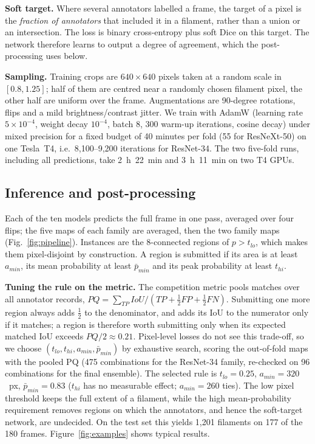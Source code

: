 \documentclass[sigconf]{acmart}
\begin{document}
    \textbf{Soft target.} Where several annotators labelled a frame, the target of a pixel is the \emph{fraction of annotators} that included it in a filament, rather than a union or an intersection. The loss is binary cross-entropy plus soft Dice on this target. The network therefore learns to output a degree of agreement, which the post-processing uses below.

    \textbf{Sampling.} Training crops are $640\times640$ pixels taken at a random scale in $[0.8, 1.25]$; half of them are centred near a randomly chosen filament pixel, the other half are uniform over the frame. Augmentations are 90-degree rotations, flips and a mild brightness/contrast jitter. We train with AdamW \cite{loshchilov2019adamw} (learning rate $5\times10^{-4}$, weight decay $10^{-4}$, batch 8, 300 warm-up iterations, cosine decay) under mixed precision for a fixed budget of 40 minutes per fold (55 for ResNeXt-50) on one Tesla~T4, i.e.\ 8{,}100--9{,}200 iterations for ResNet-34. The two five-fold runs, including all predictions, take 2~h~22~min and 3~h~11~min on two T4 GPUs.

\subsection{Inference and post-processing}
    Each of the ten models predicts the full frame in one pass, averaged over four flips; the five maps of each family are averaged, then the two family maps (Fig.~\ref{fig:pipeline}). Instances are the 8-connected regions of $p>t_{lo}$, which makes them pixel-disjoint by construction. A region is submitted if its area is at least $a_{min}$, its mean probability at least $\bar p_{min}$ and its peak probability at least $t_{hi}$.

    \textbf{Tuning the rule on the metric.} The competition metric pools matches over all annotator records, $PQ=\sum_{TP} IoU / (TP + \tfrac12 FP + \tfrac12 FN)$. Submitting one more region always adds $\tfrac12$ to the denominator, and adds its IoU to the numerator only if it matches; a region is therefore worth submitting only when its expected matched IoU exceeds $PQ/2\approx0.21$. Pixel-level losses do not see this trade-off, so we choose $(t_{lo}, t_{hi}, a_{min}, \bar p_{min})$ by exhaustive search, scoring the out-of-fold maps with the pooled PQ (475 combinations for the ResNet-34 family, re-checked on 96 combinations for the final ensemble). The selected rule is $t_{lo}=0.25$, $a_{min}=320$~px, $\bar p_{min}=0.83$ ($t_{hi}$ has no measurable effect; $a_{min}=260$ ties). The low pixel threshold keeps the full extent of a filament, while the high mean-probability requirement removes regions on which the annotators, and hence the soft-target network, are undecided. On the test set this yields 1{,}201 filaments on 177 of the 180 frames. Figure~\ref{fig:examples} shows typical results.
\end{document}
